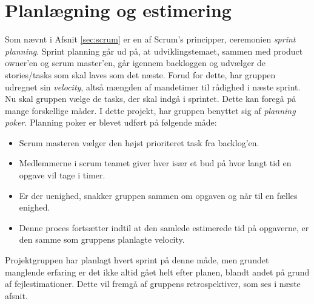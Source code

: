 \section{Planlægning og estimering}\label{sec:planning}
Som nævnt i Afsnit \ref{sec:scrum} er en af Scrum's principper, ceremonien \textit{sprint planning}.
Sprint planning går ud på, at udviklingstemaet, sammen med product owner'en og scrum master'en, går igennem
backloggen og udvælger de stories/tasks som skal laves som det næste. Forud for dette, har gruppen udregnet sin 
\textit{velocity}, altså mængden af mandetimer til rådighed i næste sprint. \\

Nu skal gruppen vælge de tasks, der skal indgå i sprintet. Dette kan foregå på mange forskellige måder.
I dette projekt, har gruppen benyttet sig af \textit{planning poker}. Planning poker er blevet udført på følgende måde:

\begin{itemize}
    \item Scrum masteren vælger den højst prioriteret task fra backlog'en.
    \item Medlemmerne i scrum teamet giver hver især et bud på hvor langt tid en opgave vil tage i timer.
    \item Er der uenighed, snakker gruppen sammen om opgaven og når til en fælles enighed.
    \item Denne proces fortsætter indtil at den samlede estimerede tid på opgaverne, er den samme som gruppens planlagte velocity.
\end{itemize}

Projektgruppen har planlagt hvert sprint på denne måde, men grundet manglende erfaring er det ikke altid gået helt efter planen, blandt andet på grund
af fejlestimationer. Dette vil fremgå af gruppens retrospektiver, som ses i næste afsnit.